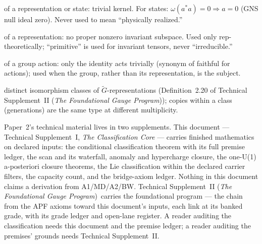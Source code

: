 \documentclass[11pt]{article}
\theoremstyle{definition}
\newcommand{\TSII}{Technical Supplement~II (\emph{The Foundational Gauge Program})}
\begin{document}
\begin{tcolorbox}[apfbox, title={Terminology: four words with one fixed meaning each}]
\footnotesize
\begin{description}[nosep,leftmargin=1.6em]
  \item[faithful] of a representation or state: trivial kernel.  For
  states: $\omega(a^*a) = 0 \Rightarrow a = 0$ (GNS null ideal zero).
  Never used to mean ``physically realized.''
  \item[irreducible] of a representation: no proper nonzero invariant
  subspace.  Used only rep-theoretically; ``primitive'' is used for
  invariant tensors, never ``irreducible.''
  \item[effective] of a group action: only the identity acts trivially
  (synonym of faithful for actions); used when the group, rather than
  its representation, is the subject.
  \item[physically distinct (multiplet types)] distinct isomorphism
  classes of $\widetilde{G}$-representations
  (Definition~2.20 of \TSII{}); copies within a class
  (generations) are the same type at different multiplicity.
\end{description}
\end{tcolorbox}

\medskip
\begin{tcolorbox}[apfbox, title={Reader's map: one paper, two supplements}]
\footnotesize
Paper~2's technical material lives in two supplements.  This document
--- Technical Supplement~I, \emph{The Classification Core} --- carries
finished mathematics on declared inputs: the conditional
classification theorem with its full premise ledger, the scan and its
waterfall, anomaly and hypercharge closure, the one-U(1) a-posteriori
closure theorems, the Lie classification within the declared carrier
filters, the capacity count, and the bridge-axiom ledger.  Nothing in
this document claims a derivation from A1/MD/A2/BW.  \TSII\ carries
the foundational program --- the chain from the APF axioms toward this
document's inputs, each link at its banked grade, with its grade
ledger and open-lane register.  A reader auditing the classification
needs this document and the premise ledger; a reader auditing the
premises' grounds needs Technical Supplement~II.
\end{tcolorbox}
\end{document}
